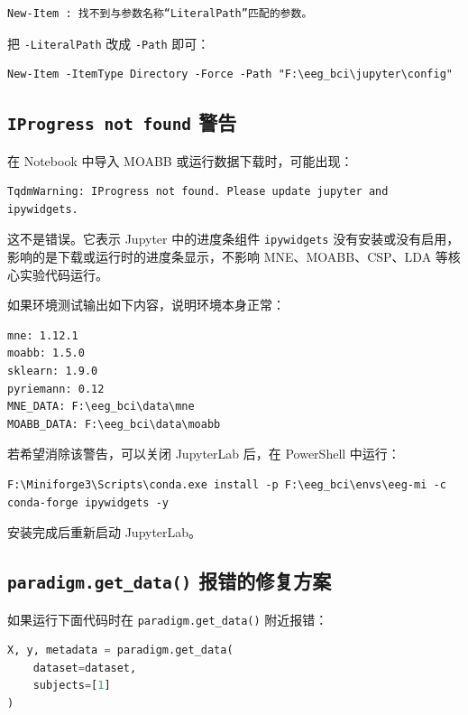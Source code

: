 \documentclass[UTF8,a4paper,12pt]{ctexart}
\begin{document}
\begin{lstlisting}[language={}]
New-Item : 找不到与参数名称“LiteralPath”匹配的参数。
\end{lstlisting}

把 \texttt{-LiteralPath} 改成 \texttt{-Path} 即可：

\begin{lstlisting}[language={},caption={使用 Path 参数}]
New-Item -ItemType Directory -Force -Path "F:\eeg_bci\jupyter\config"
\end{lstlisting}

\subsection{\texttt{IProgress not found} 警告}

在 Notebook 中导入 MOABB 或运行数据下载时，可能出现：

\begin{lstlisting}[language={}]
TqdmWarning: IProgress not found. Please update jupyter and ipywidgets.
\end{lstlisting}

这不是错误。它表示 Jupyter 中的进度条组件 \texttt{ipywidgets} 没有安装或没有启用，影响的是下载或运行时的进度条显示，不影响 MNE、MOABB、CSP、LDA 等核心实验代码运行。

如果环境测试输出如下内容，说明环境本身正常：

\begin{lstlisting}[language={}]
mne: 1.12.1
moabb: 1.5.0
sklearn: 1.9.0
pyriemann: 0.12
MNE_DATA: F:\eeg_bci\data\mne
MOABB_DATA: F:\eeg_bci\data\moabb
\end{lstlisting}

若希望消除该警告，可以关闭 JupyterLab 后，在 PowerShell 中运行：

\begin{lstlisting}[language={},caption={安装 ipywidgets}]
F:\Miniforge3\Scripts\conda.exe install -p F:\eeg_bci\envs\eeg-mi -c conda-forge ipywidgets -y
\end{lstlisting}

安装完成后重新启动 JupyterLab。

\subsection{\texttt{paradigm.get\_data()} 报错的修复方案}

如果运行下面代码时在 \texttt{paradigm.get\_data()} 附近报错：

\begin{lstlisting}[language=Python]
X, y, metadata = paradigm.get_data(
    dataset=dataset,
    subjects=[1]
)
\end{lstlisting}
\end{document}
